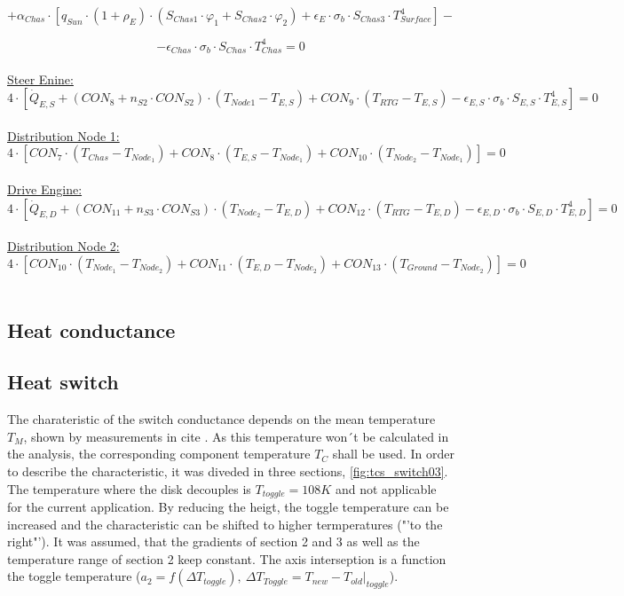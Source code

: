 \[ + \alpha_{Chas}\cdot [ q_{Sun} \cdot (1+\rho_E) \cdot (S_{Chas1} \cdot \varphi_1  +S_{Chas2} \cdot \varphi_2 ) +   \epsilon_{E} \cdot \sigma_b \cdot S_{Chas3}\cdot T_{Surface}^4 ]-\]

\[-\epsilon_{Chas}\cdot \sigma_b \cdot S_{Chas}\cdot T_{Chas}^4=0 \] \\[1em]


\underline{Steer Enine:}
\[ 4\cdot [\dot{Q}_{E,S} +(CON_8 +n_{S2}\cdot CON_{S2}) \cdot (T_{Node1}-T_{E,S})+CON_9 \cdot (T_{RTG}-T_{E,S}) -\epsilon_{E,S}\cdot \sigma_b \cdot S_{E,S}\cdot T_{E,S}^4]=0 \] \\


\underline{Distribution Node 1:}
\[ 4\cdot [CON_7 \cdot (T_{Chas}-T_{Node_1})+CON_8 \cdot (T_{E,S}-T_{Node_1})+CON_10 \cdot (T_{Node_2}-T_{Node_1})] = 0  \]\\

\underline{Drive Engine:}
\[ 4 \cdot [\dot{Q}_{E,D}+ (CON_{11}+n_{S3}\cdot CON_{S3}) \cdot (T_{Node_2}-T_{E,D})+ CON_{12} \cdot (T_{RTG}-T_{E,D})-\epsilon_{E,D}\cdot \sigma_b \cdot S_{E,D}\cdot T_{E,D}^4 ] = 0  \]\\

\underline{Distribution Node 2:}
\[ 4 \cdot [CON_{10} \cdot (T_{Node_1}-T_{Node_2})+CON_{11} \cdot (T_{E,D}-T_{Node_2})+CON_{13} \cdot (T_{Ground}-T_{Node_2})  ] = 0  \]\\


\subsection{Heat conductance} \label{sec:app_therm_2}

\subsection{Heat switch} \label{sec:app_therm_3}
The charateristic of the switch conductance depends on the mean temperature $T_M$, shown by measurements in cite .
As this temperature won´t be calculated in the analysis, the corresponding component temperature $T_C$ shall be used.
In order to describe the characteristic, it was diveded in three sections, \autoref{fig:tcs_switch03}.
The temperature where the disk decouples is $T_{toggle}=108 K$ and not applicable for the current application.
By reducing the heigt, the toggle temperature can be increased and the characteristic can be shifted to higher termperatures ("'to the right"').
It was assumed, that the gradients of section 2 and 3 as well as the temperature range of section 2 keep constant.
The axis interseption is a function the toggle temperature ($a_2=f(\Delta T_{toggle}),\ \Delta T_{Toggle}=T_{new}-T_{old}|_{toggle}$).

